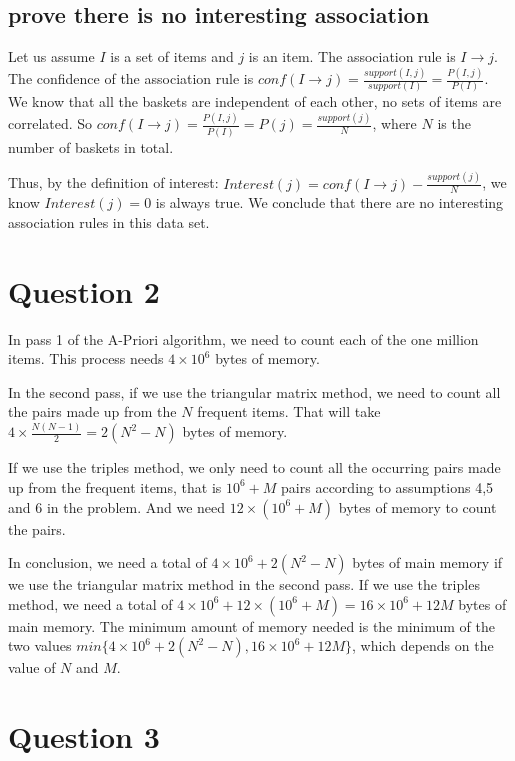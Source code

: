 \documentclass[paper=a4, fontsize=13pt]{article} %
\begin{document}
\subsection{prove there is no interesting association}
Let us assume $I$ is a set of items and $j$ is an item.
The association rule is $I \rightarrow j$.
The confidence of the association rule is $conf(I \rightarrow j)  = \frac{support(I, j)}{support(I)} = \frac{P(I,j)}{P(I)}$.
We know that all the baskets are independent of each other, no sets of items are correlated. 
So $conf(I \rightarrow j)  = \frac{P(I,j)}{P(I)} = P(j) = \frac{support(j)}{N} $, where $N$ is the number of baskets in total.

Thus, by the definition of interest: $Interest(j) = conf(I \rightarrow j) - \frac{support(j)}{N}$, we know $Interest(j) =0$ is always true.
We conclude that there are no interesting association rules in this data set.


\section{Question 2}
In pass 1 of the A-Priori algorithm, we need to count each of the one million items. This process needs $4\times10^6$ bytes of memory.

In the second pass, if we use the triangular matrix method, we need to count all the pairs made up from the $N$ frequent items.
That will take $4 \times \frac{N(N-1)}{2} = 2(N^2-N)$ bytes of memory.

If we use the triples method, we only need to count all the occurring pairs made up from the frequent items, that is $10^6 + M$ pairs according to assumptions 4,5 and 6 in the problem. And we need $12\times(10^6 + M)$ bytes of memory to count the pairs.

In conclusion, we need a total of $4\times10^6 + 2(N^2-N)$ bytes of main memory if we use the triangular matrix method in the second pass.
If we use the triples method, we need a total of $4\times10^6 + 12\times(10^6 + M) = 16\times10^6 + 12M$ bytes of main memory.
The minimum amount of memory needed is the minimum of the two values $min\{4\times10^6 + 2(N^2-N),16\times10^6 + 12M\}$, which depends on the value of $N$ and $M$.

\section{Question 3}
\end{document}
